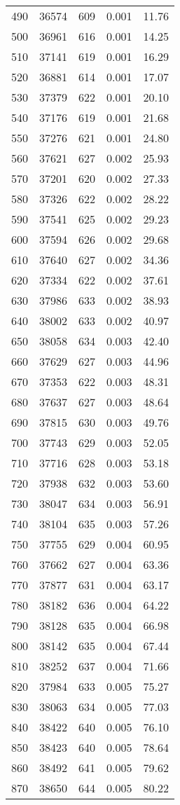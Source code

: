 \begin{longtable}{ccccc}
490 & 36574 & 609 & 0.001 & 11.76 \\
500 & 36961 & 616 & 0.001 & 14.25 \\
510 & 37141 & 619 & 0.001 & 16.29 \\
520 & 36881 & 614 & 0.001 & 17.07 \\
530 & 37379 & 622 & 0.001 & 20.10 \\
540 & 37176 & 619 & 0.001 & 21.68 \\
550 & 37276 & 621 & 0.001 & 24.80 \\
560 & 37621 & 627 & 0.002 & 25.93 \\
570 & 37201 & 620 & 0.002 & 27.33 \\
580 & 37326 & 622 & 0.002 & 28.22 \\
590 & 37541 & 625 & 0.002 & 29.23 \\
600 & 37594 & 626 & 0.002 & 29.68 \\
610 & 37640 & 627 & 0.002 & 34.36 \\
620 & 37334 & 622 & 0.002 & 37.61 \\
630 & 37986 & 633 & 0.002 & 38.93 \\
640 & 38002 & 633 & 0.002 & 40.97 \\
650 & 38058 & 634 & 0.003 & 42.40 \\
660 & 37629 & 627 & 0.003 & 44.96 \\
670 & 37353 & 622 & 0.003 & 48.31 \\
680 & 37637 & 627 & 0.003 & 48.64 \\
690 & 37815 & 630 & 0.003 & 49.76 \\
700 & 37743 & 629 & 0.003 & 52.05 \\
710 & 37716 & 628 & 0.003 & 53.18 \\
720 & 37938 & 632 & 0.003 & 53.60 \\
730 & 38047 & 634 & 0.003 & 56.91 \\
740 & 38104 & 635 & 0.003 & 57.26 \\
750 & 37755 & 629 & 0.004 & 60.95 \\
760 & 37662 & 627 & 0.004 & 63.36 \\
770 & 37877 & 631 & 0.004 & 63.17 \\
780 & 38182 & 636 & 0.004 & 64.22 \\
790 & 38128 & 635 & 0.004 & 66.98 \\
800 & 38142 & 635 & 0.004 & 67.44 \\
810 & 38252 & 637 & 0.004 & 71.66 \\
820 & 37984 & 633 & 0.005 & 75.27 \\
830 & 38063 & 634 & 0.005 & 77.03 \\
840 & 38422 & 640 & 0.005 & 76.10 \\
850 & 38423 & 640 & 0.005 & 78.64 \\
860 & 38492 & 641 & 0.005 & 79.62 \\
870 & 38650 & 644 & 0.005 & 80.22 \\
\bottomrule
\end{longtable}


